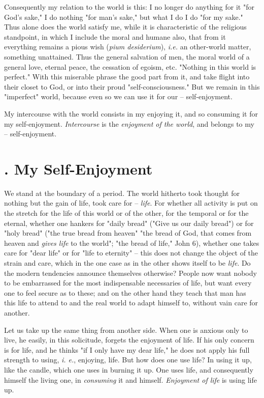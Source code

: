 Consequently my relation to the world is this: I no longer do anything for it 
"{}for God's sake,"{} I do nothing "{}for man's sake,"{} but what I do I do 
"{}for my sake."{} Thus alone does the world satisfy me, while it is 
characteristic of the religious standpoint, in which I include the moral and 
humane also, that from it everything remains a pious wish (\textit{pium 
desiderium}), \textit{i.e.} an other-world matter, something unattained. Thus 
the general salvation of men, the moral world of a general love, eternal 
peace, the cessation of egoism, etc. "{}Nothing in this world is perfect."{} 
With this miserable phrase the good part from it, and take flight into their 
closet to God, or into their proud "{}self-consciousness."{} But we remain in 
this "{}imperfect"{} world, because even so we can use it for our -- 
self-enjoyment.

My intercourse with the world consists in my enjoying it, and so consuming it 
for my self-enjoyment. \textit{Intercourse} is the \textit{enjoyment of the 
world}, and belongs to my -- self-enjoyment.

\section[3. My Self-Enjoyment]{. My Self-Enjoyment}

We stand at the boundary of a period. The world hitherto took thought for 
nothing but the gain of life, took care for -- \textit{life}. For whether all 
activity is put on the stretch for the life of this world or of the other, for 
the temporal or for the eternal, whether one hankers for "{}daily bread"{} 
("{}Give us our daily bread"{}) or for "{}holy bread"{} ("{}the true bread 
from heaven"{} "{}the bread of God, that comes from heaven and \textit{gives 
life} to the world"{}; "{}the bread of life,"{} John 6), whether one takes 
care for "{}dear life"{} or for "{}life to eternity"{} -- this does not change 
the object of the strain and care, which in the one case as in the other shows 
itself to be \textit{life}. Do the modern tendencies announce themselves 
otherwise? People now want nobody to be embarrassed for the most indispensable 
necessaries of life, but want every one to feel secure as to these; and on the 
other hand they teach that man has this life to attend to and the real world 
to adapt himself to, without vain care for another.

Let us take up the same thing from another side. When one is anxious only to 
live, he easily, in this solicitude, forgets the enjoyment of life. If his 
only concern is for life, and he thinks "{}if I only have my dear life,"{} he 
does not apply his full strength to using, \textit{i. e.}, enjoying, life. But 
how does one use life? In using it up, like the candle, which one uses in 
burning it up. One uses life, and consequently himself the living one, in 
\textit{consuming} it and himself. \textit{Enjoyment of life} is using life 
up.

